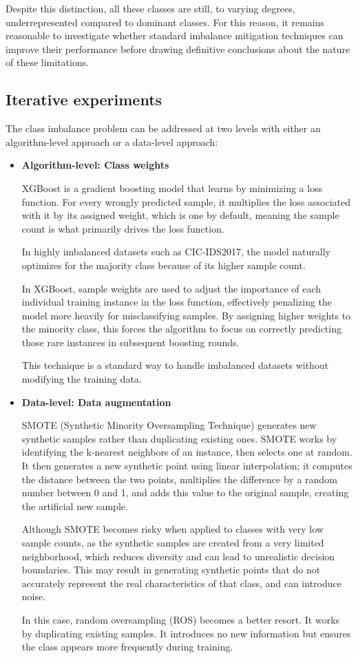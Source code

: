 Despite this distinction, all these classes are still, to varying degrees, underrepresented compared to dominant classes. For this reason, it remains reasonable to investigate whether standard imbalance mitigation techniques can improve their performance before drawing definitive conclusions about the nature of these limitations.
\subsection{Iterative experiments}

The class imbalance problem can be addressed at two levels with either an algorithm-level approach or a data-level approach:
\begin{itemize}
    \item \textbf{Algorithm-level: Class weights}

          XGBoost is a gradient boosting model that learns by minimizing a loss function. For every wrongly predicted sample, it multiplies the loss associated with it by its assigned weight, which is one by default, meaning the sample count is what primarily drives the loss function.

          In highly imbalanced datasets such as CIC-IDS2017, the model naturally optimizes for the majority class because of its higher sample count.

          In XGBoost, sample weights are used to adjust the importance of each individual training instance in the loss function, effectively penalizing the model more heavily for misclassifying samples. By assigning higher weights to the minority class, this forces the algorithm to focus on correctly predicting those rare instances in subsequent boosting rounds.

          This technique is a standard way to handle imbalanced datasets without modifying the training data.

    \item \textbf{Data-level: Data augmentation}

          SMOTE (Synthetic Minority Oversampling Technique) generates new synthetic samples rather than duplicating existing ones. SMOTE works by identifying the k-nearest neighbors of an instance, then selects one at random.
          It then generates a new synthetic point using linear interpolation; it computes the distance between the two points, multiplies the difference by a random number between 0 and 1, and adds this value to the original sample, creating the artificial new sample.

          Although SMOTE becomes risky when applied to classes with very low sample counts, as the synthetic samples are created from a very limited neighborhood, which reduces diversity and can lead to unrealistic decision boundaries. This may result in generating synthetic points that do not accurately represent the real characteristics of that class, and can introduce noise.

          In this case, random oversampling (ROS) becomes a better resort. It works by duplicating existing samples. It introduces no new information but ensures the class appears more frequently during training.
\end{itemize}

